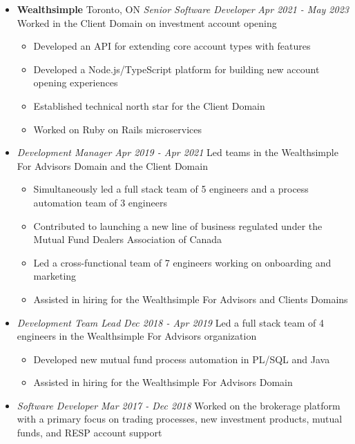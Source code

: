 \documentclass[letterpaper,11pt]{article}
\newcommand{\resumeSubHeading}[4]{
	\item[]
      \textbf{#1} \hfill #2 \newline
      \textit{#3} \hfill \textit{#4}
}
\newcommand{\jobAtSamePlace}[2]{
	\item[]
      \textit{#1} \hfill \textit{#2}
}
\begin{document}
\begin{itemize}[leftmargin=*]
    \resumeSubHeading
      {Wealthsimple}{Toronto, ON}
      {Senior Software Developer}{Apr 2021 - May 2023}\newline
      Worked in the Client Domain on investment account opening
      \begin{itemize}[noitemsep,topsep=0pt]
        \item Developed an API for extending core account types with features
      	\item Developed a Node.js/TypeScript platform for building new account opening experiences
        \item Established technical north star for the Client Domain
        \item Worked on Ruby on Rails microservices
      \end{itemize}
      \jobAtSamePlace
      {Development Manager}{Apr 2019 - Apr 2021}\newline
      Led teams in the Wealthsimple For Advisors Domain and the Client Domain 
      \begin{itemize}[noitemsep,topsep=0pt]
      	\item Simultaneously led a full stack team of 5 engineers and a process automation team of 3 engineers
      	\item Contributed to launching a new line of business regulated under the Mutual Fund Dealers Association of Canada
      	\item Led a cross-functional team of 7 engineers working on onboarding and marketing
      	\item Assisted in hiring for the Wealthsimple For Advisors and Clients Domains
      \end{itemize}
      \jobAtSamePlace
	  {Development Team Lead}{Dec 2018 - Apr 2019}\newline
	  Led a full stack team of 4 engineers in the Wealthsimple For Advisors organization
      \begin{itemize}[noitemsep,topsep=0pt]
      	\item Developed new mutual fund process automation in PL/SQL and Java
      	\item Assisted in hiring for the Wealthsimple For Advisors Domain
      \end{itemize}
      \jobAtSamePlace
      {Software Developer}{Mar 2017 - Dec 2018}\newline
      Worked on the brokerage platform with a primary focus on trading processes, new investment products, mutual funds, and RESP account support
      \begin{itemize}[noitemsep,topsep=0pt]

\end{itemize}
\end{itemize}
\end{document}
